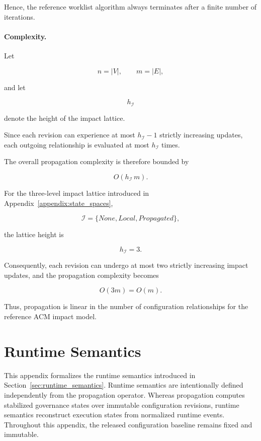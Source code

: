 \documentclass[10pt]{article}
\begin{document}
	Hence, the reference worklist algorithm always terminates after a finite number
	of iterations.
	
	\paragraph{Complexity.}
	
	Let
	
	\[
	n
	=
	|V|,
	\qquad
	m
	=
	|E|,
	\]
	
	and let
	
	\[
	h_{\mathcal I}
	\]
	
	denote the height of the impact lattice.
	
	Since each revision can experience at most
	$h_{\mathcal I}-1$
	strictly increasing updates, each outgoing relationship is evaluated at most
	$h_{\mathcal I}$
	times.
	
	The overall propagation complexity is therefore bounded by
	
	\begin{equation}
		\label{eq:worklist_complexity_final}
		O
		\!\left(
		h_{\mathcal I}
		\,m
		\right).
	\end{equation}
	
	For the three-level impact lattice introduced in
	Appendix~\ref{appendix:state_spaces},
	
	\[
	\mathcal I
	=
	\{
	None,
	Local,
	Propagated
	\},
	\]
	
	the lattice height is
	
	\[
	h_{\mathcal I}=3.
	\]
	
	Consequently, each revision can undergo at most two strictly increasing impact
	updates, and the propagation complexity becomes
	
	\begin{equation}
		\label{eq:worklist_complexity_acm}
		O(3m)
		=
		O(m).
	\end{equation}
	
	Thus, propagation is linear in the number of configuration relationships for
	the reference ACM impact model.
	
	\section{Runtime Semantics}
	\label{appendix:runtime_semantics}
	
	This appendix formalizes the runtime semantics introduced in
	Section~\ref{sec:runtime_semantics}. Runtime semantics are intentionally
	defined independently from the propagation operator. Whereas propagation
	computes stabilized governance states over immutable configuration revisions,
	runtime semantics reconstruct execution states from normalized runtime events.
	Throughout this appendix, the released configuration baseline remains fixed and
	immutable.
	
\end{document}
